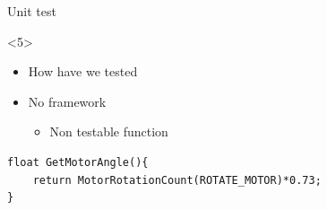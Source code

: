 \begin{frame}[fragile]{Unit test}
\begin{onlyenv}<5>
\begin{itemize}
  \item How have we tested
  \item No framework
  \begin{itemize}
  \item Non testable function
\end{itemize}
\end{itemize}
\begin{center}
\begin{minipage}[H]{0.9\linewidth}
\begin{lstlisting}
float GetMotorAngle(){
    return MotorRotationCount(ROTATE_MOTOR)*0.73;
}
\end{lstlisting} 
\end{minipage}
\end{center}
\end{onlyenv}
\end{frame}

